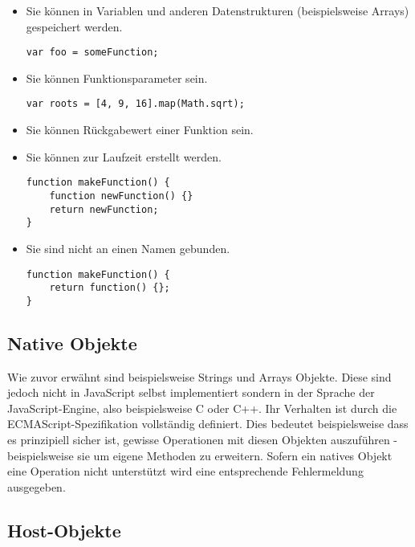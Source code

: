 \begin{itemize}
\item Sie können in Variablen und anderen Datenstrukturen (beispielsweise Arrays) gespeichert
werden.
\begin{lstlisting}[caption=Zuweisung einer Funktion an eine Variable]
var foo = someFunction;
\end{lstlisting}

\item Sie können Funktionsparameter sein.
\begin{lstlisting}[caption=Erstellen einer neuen Liste mittels einer Transformationsfunktion]
var roots = [4, 9, 16].map(Math.sqrt);
\end{lstlisting}

\item Sie können Rückgabewert einer Funktion sein.

\item Sie können zur Laufzeit erstellt werden.
\begin{lstlisting}[caption=Eine Funktion\, die eine neue Funktion erstellt und zurückgibt]
function makeFunction() {
    function newFunction() {}
    return newFunction;
}
\end{lstlisting}

\item Sie sind nicht an einen Namen gebunden.
\begin{lstlisting}[caption=Erstellen einer anonymen Funktion]
function makeFunction() {
    return function() {};
}
\end{lstlisting}
\end{itemize}


\subsection{Native Objekte}
Wie zuvor erwähnt sind beispielsweise Strings und Arrays Objekte. Diese sind jedoch nicht in
JavaScript selbst implementiert sondern in der Sprache der JavaScript-Engine, also beispielsweise C
oder C++. Ihr Verhalten ist durch die ECMAScript-Spezifikation \citep{ecmascript} vollständig
definiert. Dies bedeutet beispielsweise dass es prinzipiell sicher ist, gewisse Operationen mit
diesen Objekten auszuführen - beispielsweise sie um eigene Methoden zu erweitern. Sofern ein natives
Objekt eine Operation nicht unterstützt wird eine entsprechende Fehlermeldung ausgegeben.



\subsection{Host-Objekte}

